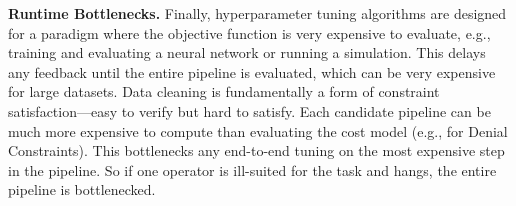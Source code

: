 \vspace{0.5em}
\noindent \textbf{Runtime Bottlenecks. } Finally, hyperparameter tuning algorithms are designed for a paradigm where the objective function is very expensive to evaluate, e.g., training and evaluating a neural network or running a simulation. This delays any feedback until the entire pipeline is evaluated, which can be very expensive for large datasets. Data cleaning is fundamentally a form of constraint satisfaction---easy to verify but hard to satisfy.
Each candidate pipeline can be much more expensive to compute than evaluating the cost model (e.g., for Denial Constraints).  This bottlenecks any end-to-end tuning on the most expensive step in the pipeline.
So if one operator is ill-suited for the task and hangs, the entire pipeline is bottlenecked.








